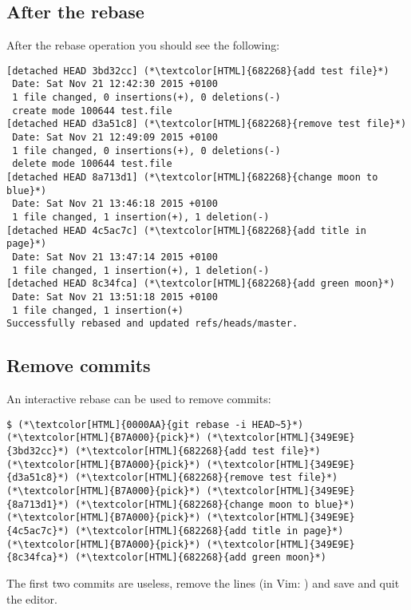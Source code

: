 \subsection{After the rebase}
\begin{frame}[fragile]
  \subslidetitle

   After the rebase operation you should see the following:
  \begin{lstlisting}
[detached HEAD 3bd32cc] (*\textcolor[HTML]{682268}{add test file}*)
 Date: Sat Nov 21 12:42:30 2015 +0100
 1 file changed, 0 insertions(+), 0 deletions(-)
 create mode 100644 test.file
[detached HEAD d3a51c8] (*\textcolor[HTML]{682268}{remove test file}*)
 Date: Sat Nov 21 12:49:09 2015 +0100
 1 file changed, 0 insertions(+), 0 deletions(-)
 delete mode 100644 test.file
[detached HEAD 8a713d1] (*\textcolor[HTML]{682268}{change moon to blue}*)
 Date: Sat Nov 21 13:46:18 2015 +0100
 1 file changed, 1 insertion(+), 1 deletion(-)
[detached HEAD 4c5ac7c] (*\textcolor[HTML]{682268}{add title in page}*)
 Date: Sat Nov 21 13:47:14 2015 +0100
 1 file changed, 1 insertion(+), 1 deletion(-)
[detached HEAD 8c34fca] (*\textcolor[HTML]{682268}{add green moon}*)
 Date: Sat Nov 21 13:51:18 2015 +0100
 1 file changed, 1 insertion(+)
Successfully rebased and updated refs/heads/master.
\end{lstlisting}
\end{frame}

\subsection{Remove commits}
\begin{frame}[fragile]
  \subslidetitle
  An interactive rebase can be used to remove commits:
  \begin{lstlisting}
$ (*\textcolor[HTML]{0000AA}{git rebase -i HEAD~5}*)
(*\textcolor[HTML]{B7A000}{pick}*) (*\textcolor[HTML]{349E9E}{3bd32cc}*) (*\textcolor[HTML]{682268}{add test file}*)
(*\textcolor[HTML]{B7A000}{pick}*) (*\textcolor[HTML]{349E9E}{d3a51c8}*) (*\textcolor[HTML]{682268}{remove test file}*)
(*\textcolor[HTML]{B7A000}{pick}*) (*\textcolor[HTML]{349E9E}{8a713d1}*) (*\textcolor[HTML]{682268}{change moon to blue}*)
(*\textcolor[HTML]{B7A000}{pick}*) (*\textcolor[HTML]{349E9E}{4c5ac7c}*) (*\textcolor[HTML]{682268}{add title in page}*)
(*\textcolor[HTML]{B7A000}{pick}*) (*\textcolor[HTML]{349E9E}{8c34fca}*) (*\textcolor[HTML]{682268}{add green moon}*)
\end{lstlisting}
  The first two commits are useless, remove the lines (in Vim: ) and save and quit the editor.

\end{frame}

